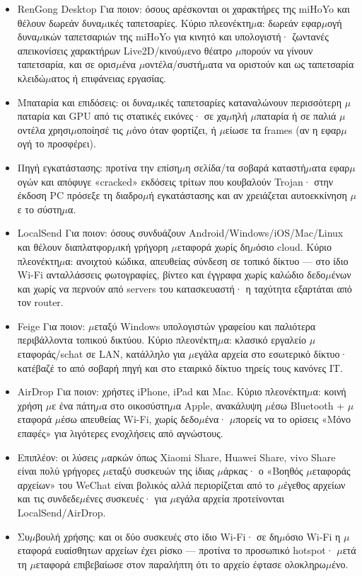 \begin{itemize}
  \item RenGong Desktop Για ποιον: όσους αρέσκονται οι χαρακτήρες της miHoYo και θέλουν δωρεάν δυνα$\mu$ικές ταπετσαρίες. Κύριο πλεονέκτη$\mu$α: δωρεάν εφαρ$\mu$ογή δυνα$\mu$ικών ταπετσαριών της miHoYo για κινητό και υπολογιστή· ζωντανές απεικονίσεις χαρακτήρων Live2D/κινού$\mu$ενο θέατρο $\mu$πορούν να γίνουν ταπετσαρία, και σε ορισ$\mu$ένα $\mu$οντέλα/συστή$\mu$ατα να οριστούν και ως ταπετσαρία κλειδώ$\mu$ατος ή επιφάνειας εργασίας.
  \item Μπαταρία και επιδόσεις: οι δυνα$\mu$ικές ταπετσαρίες καταναλώνουν περισσότερη $\mu$παταρία και GPU από τις στατικές εικόνες· σε χα$\mu$ηλή $\mu$παταρία ή σε παλιά $\mu$οντέλα χρησι$\mu$οποίησέ τις $\mu$όνο όταν φορτίζει, ή $\mu$είωσε τα frames (αν η εφαρ$\mu$ογή το προσφέρει).
  \item Πηγή εγκατάστασης: προτίνα την επίση$\mu$η σελίδα/τα σοβαρά καταστή$\mu$ατα εφαρ$\mu$ογών και απόφυγε «cracked» εκδόσεις τρίτων που κουβαλούν Trojan· στην έκδοση PC πρόσεξε τη διαδρο$\mu$ή εγκατάστασης και αν χρειάζεται αυτοεκκίνηση $\mu$ε το σύστη$\mu$α.
\end{itemize}


\begin{itemize}
  \item LocalSend Για ποιον: όσους συνδυάζουν Android/Windows/iOS/Mac/Linux και θέλουν διαπλατφορ$\mu$ική γρήγορη $\mu$εταφορά χωρίς δη$\mu$όσιο cloud. Κύριο πλεονέκτη$\mu$α: ανοιχτού κώδικα, απευθείας σύνδεση σε τοπικό δίκτυο — στο ίδιο Wi-Fi ανταλλάσσεις φωτογραφίες, βίντεο και έγγραφα χωρίς καλώδιο δεδο$\mu$ένων και χωρίς να περνούν από servers του κατασκευαστή· η ταχύτητα εξαρτάται από τον router.
  \item Feige Για ποιον: $\mu$εταξύ Windows υπολογιστών γραφείου και παλιότερα περιβάλλοντα τοπικού δικτύου. Κύριο πλεονέκτη$\mu$α: κλασικό εργαλείο $\mu$εταφοράς/schat σε LAN, κατάλληλο για $\mu$εγάλα αρχεία στο εσωτερικό δίκτυο· κατέβαζέ το από σοβαρή πηγή και στο εταιρικό δίκτυο τηρείς τους κανόνες IT.
  \item AirDrop Για ποιον: χρήστες iPhone, iPad και Mac. Κύριο πλεονέκτη$\mu$α: κοινή χρήση $\mu$ε ένα πάτη$\mu$α στο οικοσύστη$\mu$α Apple, ανακάλυψη $\mu$έσω Bluetooth + $\mu$εταφορά $\mu$έσω απευθείας Wi-Fi, χωρίς δεδο$\mu$ένα· $\mu$πορείς να το ορίσεις «Μόνο επαφές» για λιγότερες ενοχλήσεις από αγνώστους.
  \item Επιπλέον: οι λύσεις $\mu$αρκών όπως Xiaomi Share, Huawei Share, vivo Share είναι πολύ γρήγορες $\mu$εταξύ συσκευών της ίδιας $\mu$άρκας· ο «Βοηθός $\mu$εταφοράς αρχείων» του WeChat είναι βολικός αλλά περιορίζεται από το $\mu$έγεθος αρχείων και τις συνδεδε$\mu$ένες συσκευές· για $\mu$εγάλα αρχεία προτείνονται LocalSend/AirDrop.
  \item Συ$\mu$βουλή χρήσης: και οι δύο συσκευές στο ίδιο Wi-Fi· σε δη$\mu$όσιο Wi-Fi η $\mu$εταφορά ευαίσθητων αρχείων έχει ρίσκο — προτίνα το προσωπικό hotspot· $\mu$ετά τη $\mu$εταφορά επιβεβαίωσε στον παραλήπτη ότι το αρχείο έφτασε ολοκληρω$\mu$ένο.
\end{itemize}

